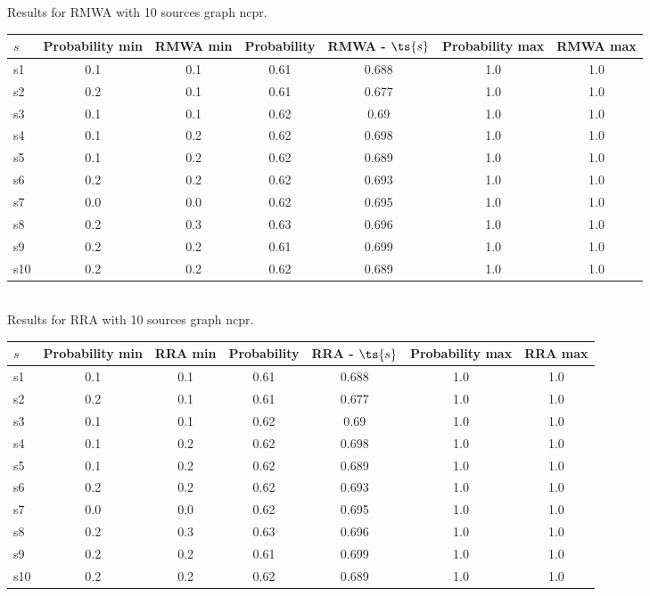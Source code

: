 \documentclass{article}
\begin{document}
\noindent Results for RMWA with 10 sources graph ncpr.

\noindent\begin{tabular}{|l|c|c|c|c|c|c|}
\hline
$s$& Probability min & RMWA min & Probability & RMWA - $\ts{s}$ & Probability max & RMWA max\\
\hline
s1 &0.1 & 0.1 & 0.61 & 0.688 & 1.0 & 1.0\\
\hline
s2 &0.2 & 0.1 & 0.61 & 0.677 & 1.0 & 1.0\\
\hline
s3 &0.1 & 0.1 & 0.62 & 0.69 & 1.0 & 1.0\\
\hline
s4 &0.1 & 0.2 & 0.62 & 0.698 & 1.0 & 1.0\\
\hline
s5 &0.1 & 0.2 & 0.62 & 0.689 & 1.0 & 1.0\\
\hline
s6 &0.2 & 0.2 & 0.62 & 0.693 & 1.0 & 1.0\\
\hline
s7 &0.0 & 0.0 & 0.62 & 0.695 & 1.0 & 1.0\\
\hline
s8 &0.2 & 0.3 & 0.63 & 0.696 & 1.0 & 1.0\\
\hline
s9 &0.2 & 0.2 & 0.61 & 0.699 & 1.0 & 1.0\\
\hline
s10 &0.2 & 0.2 & 0.62 & 0.689 & 1.0 & 1.0\\
\hline
\end{tabular}\\

\noindent Results for RRA with 10 sources graph ncpr.

\noindent\begin{tabular}{|l|c|c|c|c|c|c|}
\hline
$s$& Probability min & RRA min & Probability & RRA - $\ts{s}$ & Probability max & RRA max\\
\hline
s1 &0.1 & 0.1 & 0.61 & 0.688 & 1.0 & 1.0\\
\hline
s2 &0.2 & 0.1 & 0.61 & 0.677 & 1.0 & 1.0\\
\hline
s3 &0.1 & 0.1 & 0.62 & 0.69 & 1.0 & 1.0\\
\hline
s4 &0.1 & 0.2 & 0.62 & 0.698 & 1.0 & 1.0\\
\hline
s5 &0.1 & 0.2 & 0.62 & 0.689 & 1.0 & 1.0\\
\hline
s6 &0.2 & 0.2 & 0.62 & 0.693 & 1.0 & 1.0\\
\hline
s7 &0.0 & 0.0 & 0.62 & 0.695 & 1.0 & 1.0\\
\hline
s8 &0.2 & 0.3 & 0.63 & 0.696 & 1.0 & 1.0\\
\hline
s9 &0.2 & 0.2 & 0.61 & 0.699 & 1.0 & 1.0\\
\hline
s10 &0.2 & 0.2 & 0.62 & 0.689 & 1.0 & 1.0\\
\hline
\end{tabular}\\
\end{document}
